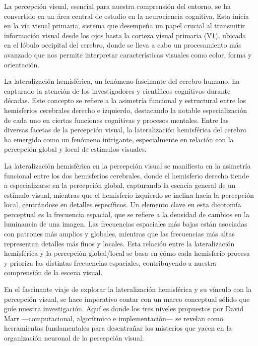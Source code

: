 \documentclass[12pt,oneside]{uhthesis}
\begin{document}
La percepción visual, esencial para nuestra comprensión del entorno, se ha convertido en un área central de estudio en la neurociencia cognitiva. Esta inicia en la vía visual primaria, sistema que desempeña un papel crucial al transmitir información visual desde los ojos hasta la corteza visual primaria (V1), ubicada en el lóbulo occipital del cerebro, donde se lleva a cabo un procesamiento más avanzado que nos permite interpretar características visuales como color, forma y orientación.

La lateralización hemisférica, un fenómeno fascinante del cerebro humano, ha capturado la atención de los investigadores y científicos cognitivos durante décadas. Este concepto se refiere a la asimetría funcional y estructural entre los hemisferios cerebrales derecho e izquierdo, destacando la notable especialización de cada uno en ciertas funciones cognitivas y procesos mentales. Entre las diversas facetas de la percepción visual, la lateralización hemisférica del cerebro ha emergido como un fenómeno intrigante, especialmente en relación con la percepción global y local de estímulos visuales.

La lateralización hemisférica en la percepción visual se manifiesta en la asimetría funcional entre los dos hemisferios cerebrales, donde el hemisferio derecho tiende a especializarse en la percepción global, capturando la esencia general de un estímulo visual, mientras que el hemisferio izquierdo se inclina hacia la percepción local, centrándose en detalles específicos. Un elemento clave en esta dicotomía perceptual es la frecuencia espacial, que se refiere a la densidad de cambios en la luminancia de una imagen. Las frecuencias espaciales más bajas están asociadas con patrones más amplios y globales, mientras que las frecuencias más altas representan detalles más finos y locales. Esta relación entre la lateralización hemisférica y la percepción global/local se basa en cómo cada hemisferio procesa y prioriza las distintas frecuencias espaciales, contribuyendo a nuestra comprensión de la escena visual.

En el fascinante viaje de explorar la lateralización hemisférica y su vínculo con la percepción visual, se hace imperativo contar con un marco conceptual sólido que guíe nuestra investigación. Aquí es donde los tres niveles propuestos por David Marr —computacional, algorítmico e implementación— se revelan como herramientas fundamentales para desentrañar los misterios que yacen en la organización neuronal de la percepción visual.
\end{document}
